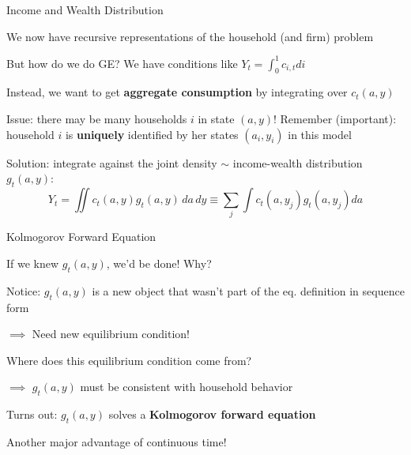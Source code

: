 \documentclass[11pt, aspectratio=169]{beamer}
\newenvironment{witemize}{\itemize\addtolength{\itemsep}{10pt}}{\enditemize}
\begin{document}
\begin{frame}{Income and Wealth Distribution}

\begin{witemize}
\item We now have recursive representations of the household (and firm) problem 

\item But how do we do GE? We have conditions like $Y_t = \int_0^1 c_{i, t} di$

\item Instead, we want to get \textbf{aggregate consumption} by integrating over $c_t(a, y)$

\item Issue: there may be many households $i$ in state $(a, y)$! Remember (important): household $i$ is \textbf{uniquely} identified by her states $(a_i, y_i)$ in this model

\item Solution: integrate against the joint density $\sim$ income-wealth distribution $g_t(a, y)$:
\begin{equation*}
	Y_t = \iint c_t(a, y) g_t(a, y) \, da \, dy \equiv \sum_j \int c_t(a, y_j) g_t(a, y_j) da
\end{equation*}
\end{witemize}
\end{frame}



\begin{frame}{Kolmogorov Forward Equation}

\begin{witemize}
\item If we knew $g_t(a, y)$, we'd be done! Why?

\pause	
\item Notice: $g_t(a, y)$ is a new object that wasn't part of the eq. definition in sequence form 

$\implies$ Need new equilibrium condition!

\item Where does this equilibrium condition come from?

\pause
$\implies$ $g_t(a, y)$ must be consistent with household behavior

\item Turns out: $g_t(a, y)$ solves a \textbf{Kolmogorov forward equation}

\item Another major advantage of continuous time!

\end{witemize}
\end{frame}
\end{document}
